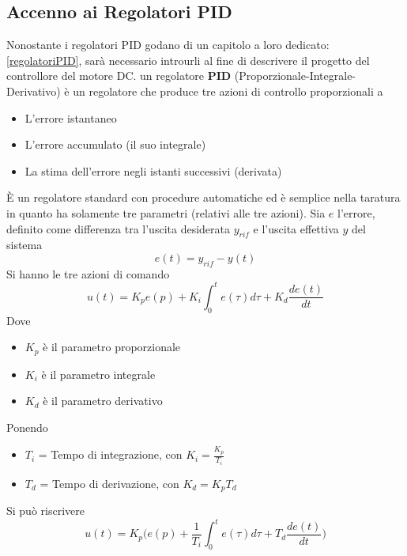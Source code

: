 \documentclass[10pt, letterpaper]{report}
\begin{document}
\subsection{Accenno ai Regolatori PID}
Nonostante i regolatori PID godano di un capitolo a loro dedicato: \ref{regolatoriPID}, sarà necessario introurli al fine di descrivere il progetto del controllore del motore DC.\acc 
{} un regolatore \textbf{PID} (Proporzionale-Integrale-Derivativo) è un regolatore che produce tre azioni di controllo proporzionali a \begin{itemize}
    \item L'errore istantaneo 
    \item L'errore accumulato (il suo integrale)
    \item La stima dell'errore negli istanti successivi (derivata)
\end{itemize}
È un regolatore standard con procedure automatiche ed è semplice nella taratura in quanto ha solamente tre parametri (relativi alle tre azioni). \acc 
Sia $e$ l'errore, definito come differenza tra l'uscita desiderata $y_{rif}$ e l'uscita effettiva $y$ del sistema 
$$ e(t)=y_{rif}-y(t)$$
Si hanno le tre azioni di comando 
$$ u(t)=K_pe(p)+K_i\int_0^t e(\tau)d\tau+K_d\frac{de(t)}{dt}$$
Dove \begin{itemize}
    \item $K_p$ è il parametro proporzionale 
    \item $K_i$ è il parametro integrale 
    \item $K_d$ è il parametro derivativo 
\end{itemize}
Ponendo \begin{itemize}
\item $T_i$ = Tempo di integrazione, con $K_i=\frac{K_p}{T_i}$
\item $T_d$ = Tempo di derivazione, con $K_d=K_pT_d$
\end{itemize}
Si può riscrivere
$$ u(t)=K_p\Big(e(p)+\frac{1}{T_i}\int_0^t e(\tau)d\tau+T_d\frac{de(t)}{dt}\Big)$$
\end{document}
